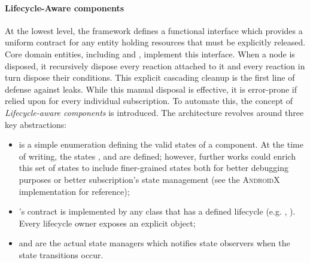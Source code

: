 \paragraph{Lifecycle-Aware components} At the lowest level, the framework
defines a functional interface  which provides a uniform
contract for any entity holding resources that must be explicitly released.
Core domain entities, including  and , implement
this interface. When a node is disposed, it recursively dispose every reaction
attached to it and every reaction in turn dispose their conditions. This
explicit cascading cleanup is the first line of defense against leaks. While
this manual disposal is effective, it is error-prone if relied upon for every
individual subscription. To automate this, the concept of \emph{Lifecycle-aware
	components} is introduced. The architecture revolves around three key
abstractions:
\begin{itemize}
	\item {} is a simple enumeration defining the valid
	      states of a component. At the time of writing, the states
	      ,  and  are
	      defined; however, further works could enrich this set of states to
	      include finer-grained states both for better debugging purposes or
	      better subscription's state management (see the \textsc{AndroidX}
	      implementation for reference);
	\item {}'s contract is implemented by any class that
	      has a defined lifecycle (e.g. , ).
	      Every lifecycle owner exposes an explicit  object;
	\item {} and  are the actual
	      state managers which notifies state observers when the state
	      transitions occur.
\end{itemize}

